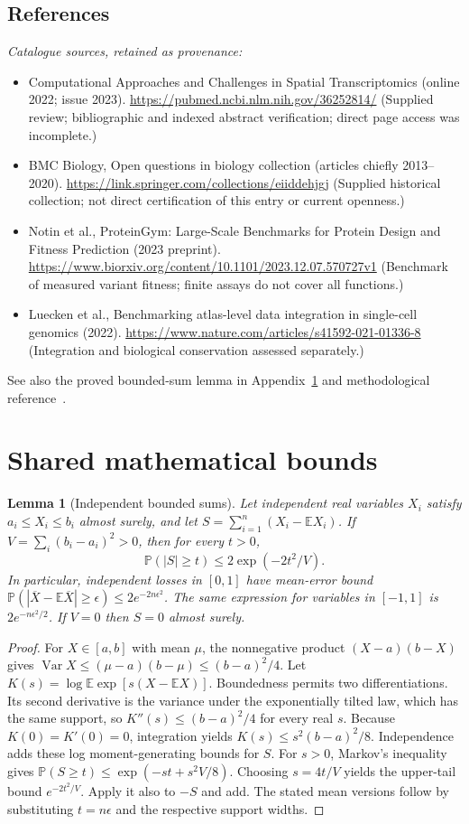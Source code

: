 \documentclass[11pt]{article}
\newcommand{\E}{\mathbb E}
\newcommand{\Prob}{\mathbb P}
\DeclareMathOperator{\Var}{Var}
\providecommand{\E}{\mathbb E}
\providecommand{\Prob}{\mathbb P}
\providecommand{\Var}{\operatorname{Var}}
\newtheorem{sharedlemma}{Lemma}[section]
\begin{document}
\subsection{References}
\noindent\emph{Catalogue sources, retained as provenance:}
\begin{itemize}
\item Computational Approaches and Challenges in Spatial Transcriptomics (online 2022; issue 2023). \url{https://pubmed.ncbi.nlm.nih.gov/36252814/} (Supplied review; bibliographic and indexed abstract verification; direct page access was incomplete.)
\item BMC Biology, Open questions in biology collection (articles chiefly 2013--2020). \url{https://link.springer.com/collections/eiiddehjgj} (Supplied historical collection; not direct certification of this entry or current openness.)
\item Notin et al., ProteinGym: Large-Scale Benchmarks for Protein Design and Fitness Prediction (2023 preprint). \url{https://www.biorxiv.org/content/10.1101/2023.12.07.570727v1} (Benchmark of measured variant fitness; finite assays do not cover all functions.)
\item Luecken et al., Benchmarking atlas-level data integration in single-cell genomics (2022). \url{https://www.nature.com/articles/s41592-021-01336-8} (Integration and biological conservation assessed separately.)
\end{itemize}
\noindent See also the proved bounded-sum lemma in Appendix~\ref{app:bounds} and methodological reference~\cite{hoeffding}.
\clearpage


\appendix
\section{Shared mathematical bounds}\label{app:bounds}
\begin{sharedlemma}[Independent bounded sums]\label{lem:bounded}
Let independent real variables $X_i$ satisfy $a_i\leq X_i\leq b_i$ almost surely,
and let $S=\sum_{i=1}^n(X_i-\E X_i)$. If
$V=\sum_i(b_i-a_i)^2>0$, then for every $t>0$,
\[
 \Prob(|S|\geq t)\leq 2\exp(-2t^2/V).
\]
In particular, independent losses in $[0,1]$ have mean-error bound
$\Prob(|\overline X-\E\overline X|\geq\epsilon)
\leq2e^{-2n\epsilon^2}$. The same expression for variables in $[-1,1]$
is $2e^{-n\epsilon^2/2}$. If $V=0$ then $S=0$ almost surely.
\end{sharedlemma}
\begin{proof}
For $X\in[a,b]$ with mean $\mu$, the nonnegative product
$(X-a)(b-X)$ gives
$\Var X\leq(\mu-a)(b-\mu)\leq(b-a)^2/4$.
Let $K(s)=\log\E\exp[s(X-\E X)]$.
Boundedness permits two differentiations. Its second derivative is the variance
under the exponentially tilted law, which has the same support, so
$K''(s)\leq(b-a)^2/4$ for every real $s$.
Because $K(0)=K'(0)=0$, integration yields
$K(s)\leq s^2(b-a)^2/8$.
Independence adds these log moment-generating bounds for $S$.
For $s>0$, Markov's inequality gives
$\Prob(S\geq t)\leq\exp(-st+s^2V/8)$.
Choosing $s=4t/V$ yields the upper-tail bound $e^{-2t^2/V}$.
Apply it also to $-S$ and add. The stated mean versions follow by substituting
$t=n\epsilon$ and the respective support widths.
\end{proof}
\end{document}
